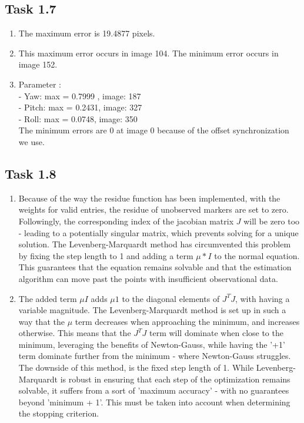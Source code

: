 \documentclass[a4paper]{article} %
\begin{document}
    \subsection*{Task 1.7}
    \begin{enumerate}[label=(\alph*)]
        \item The maximum error is 19.4877 pixels.
        \item This maximum error occurs in image 104.
        The minimum error occurs in image 152.
        \item Parameter : \\
        - Yaw: max = 0.7999 , image: 187 \\
        - Pitch: max = 0.2431, image: 327 \\
        - Roll: max = 0.0748, image: 350 \\
        The minimum errors are 0 at image 0 because of the offset synchronization we use.
    \end{enumerate}

    \subsection*{Task 1.8}
    \begin{enumerate}[label=(\alph*)]
        \item Because of the way the residue function has been implemented, with the weights for valid entries, the residue of unobserved markers are set to zero.
            Followingly, the corresponding index of the jacobian matrix $J$ will be zero too - leading to a potentially singular matrix, which prevents solving for a unique solution.
            The Levenberg-Marquardt method has circumvented this problem by fixing the step length to 1 and adding a term $\mu*I$ to the normal equation.
            This guarantees that the equation remains solvable and that the estimation algorithm can move past the points with insufficient observational data.
        \item The added term $\mu I$ adds $\mu 1$ to the diagonal elements of $J^TJ$, with \mu having a variable magnitude.
            The Levenberg-Marquardt method is set up in such a way that the $\mu$ term decreases when approaching the minimum, and increases otherwise.
            This means that the $J^TJ$ term will dominate when close to the minimum, leveraging the benefits of Newton-Gauss, while having the '+1' term dominate further from the minimum - where Newton-Gauss struggles.
            The downside of this method, is the fixed step length of 1.
            While Levenberg-Marquardt is robust in ensuring that each step of the optimization remains solvable, it suffers from a sort of 'maximum accuracy' - with no guarantees beyond 'minimum + 1'.
            This must be taken into account when determining the stopping criterion.
    \end{enumerate}
\end{document}
